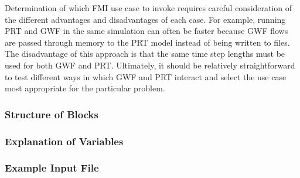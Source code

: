 \noindent Determination of which FMI use case to invoke requires careful consideration of the different advantages and disadvantages of each case.  For example, running PRT and GWF in the same simulation can often be faster because GWF flows are passed through memory to the PRT model instead of being written to files.  The disadvantage of this approach is that the same time step lengths must be used for both GWF and PRT.  Ultimately, it should be relatively straightforward to test different ways in which GWF and PRT interact and select the use case most appropriate for the particular problem. 

\vspace{5mm}
\subsubsection{Structure of Blocks}



\vspace{5mm}
\subsubsection{Explanation of Variables}
\begin{description}

\end{description}

\vspace{5mm}
\subsubsection{Example Input File}


